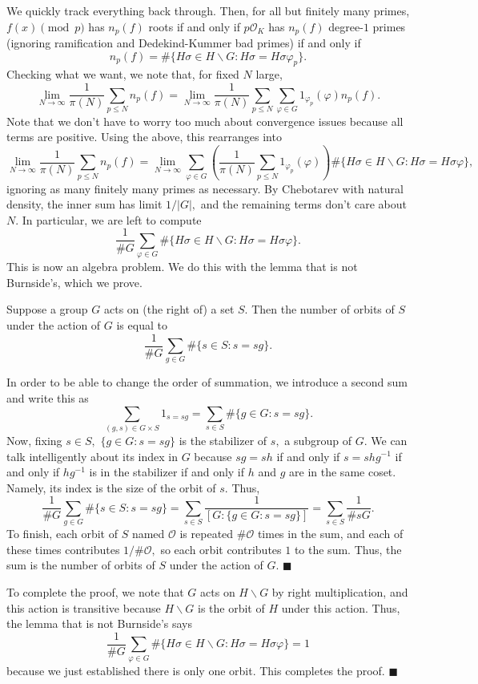 We quickly track everything back through. Then, for all but finitely many primes, $f(x)\pmod p$ has $n_p(f)$ roots if and only if $p\mathcal O_K$ has $n_p(f)$ degree-$1$ primes (ignoring ramification and Dedekind-Kummer bad primes) if and only if
\[n_p(f)=\#\{H\sigma\in H\backslash G:H\sigma=H\sigma\varphi_p\}.\]
Checking what we want, we note that, for fixed $N$ large,
\[\lim_{N\to\infty}\frac1{\pi(N)}\sum_{p\le N}n_p(f)=\lim_{N\to\infty}\frac1{\pi(N)}\sum_{p\le N}\sum_{\varphi\in G}1_{\varphi_p}(\varphi)n_p(f).\]
Note that we don't have to worry too much about convergence issues because all terms are positive. Using the above, this rearranges into
\[\lim_{N\to\infty}\frac1{\pi(N)}\sum_{p\le N}n_p(f)=\lim_{N\to\infty}\sum_{\varphi\in G}\left(\frac1{\pi(N)}\sum_{p\le N}1_{\varphi_p}(\varphi)\right)\#\{H\sigma\in H\backslash G:H\sigma=H\sigma\varphi\},\]
ignoring as many finitely many primes as necessary. By Chebotarev with natural density, the inner sum has limit $1/|G|,$ and the remaining terms don't care about $N.$ In particular, we are left to compute
\[\frac1{\#G}\sum_{\varphi\in G}\#\{H\sigma\in H\backslash G:H\sigma=H\sigma\varphi\}.\]
This is now an algebra problem. We do this with the lemma that is not Burnside's, which we prove.
\begin{lemma}
    Suppose a group $G$ acts on (the right of) a set $S.$ Then the number of orbits of $S$ under the action of $G$ is equal to
    \[\frac1{\#G}\sum_{g\in G}\#\{s\in S:s=sg\}.\]
\end{lemma}
In order to be able to change the order of summation, we introduce a second sum and write this as
\[\sum_{(g,s)\in G\times S}1_{s=sg}=\sum_{s\in S}\#\{g\in G:s=sg\}.\]
Now, fixing $s\in S,$ $\{g\in G:s=sg\}$ is the stabilizer of $s,$ a subgroup of $G.$ We can talk intelligently about its index in $G$ because $sg=sh$ if and only if $s=shg^{-1}$ if and only if $hg^{-1}$ is in the stabilizer if and only if $h$ and $g$ are in the same coset. Namely, its index is the size of the orbit of $s.$ Thus,
\[\frac1{\#G}\sum_{g\in G}\#\{s\in S:s=sg\}=\sum_{s\in S}\frac1{[G:\{g\in G:s=sg\}]}=\sum_{s\in S}\frac1{\#sG}.\]
To finish, each orbit of $S$ named $\mathcal O$ is repeated $\#\mathcal O$ times in the sum, and each of these times contributes $1/\#\mathcal O,$ so each orbit contributes $1$ to the sum. Thus, the sum is the number of orbits of $S$ under the action of $G.$ $\blacksquare$

To complete the proof, we note that $G$ acts on $H\backslash G$ by right multiplication, and this action is transitive because $H\backslash G$ is the orbit of $H$ under this action. Thus, the lemma that is not Burnside's says
\[\frac1{\#G}\sum_{\varphi\in G}\#\{H\sigma\in H\backslash G:H\sigma=H\sigma\varphi\}=1\]
because we just established there is only one orbit. This completes the proof. $\blacksquare$

